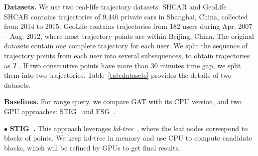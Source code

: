 \documentclass[10pt,conference,letterpaper]{IEEEtran}
\newcommand{\frname}{GAT\xspace }
\newcommand{\alltraj}{{{\cal T}}\xspace}
\begin{document}
\vspace{0.1cm}\textbf{Datasets.}
We use two real-life trajectory datasets: SHCAR and  GeoLife~\cite{DBLP:journals/debu/ZhengXM10}.
SHCAR contains trajectories of 9,446 private cars in Shanghai, China, collected from 2014 to 2015. GeoLife contains trajectories from 182 users during Apr. 2007 -- Aug. 2012, where most trajectory points are within Beijing, China.
%
The original datasets contain one complete trajectory for each user.
We split the sequence of trajectory points from each user into several subsequences, to obtain trajectories as $\alltraj$. If two consecutive points have more than 30 minutes time gap, we split them into two trajectories.
Table~\ref{tab:datasets} provides the details of two datasets.



\vspace{0.1cm}\textbf{Baselines.}
For range query, we compare \frname with its CPU version, and two GPU approaches: STIG~\cite{7498315} and FSG~\cite{GPUTaxi}.

\vspace{0.1cm}$\bullet$ \textbf{STIG~\cite{7498315}.} This approach leverages \emph{kd-tree}~\cite{DBLP:journals/cacm/Bentley75}, where the leaf nodes correspond to blocks of points.
We keep kd-tree in memory and use CPU to compute candidate blocks, which will be refined by GPUs to get final results.
\end{document}
